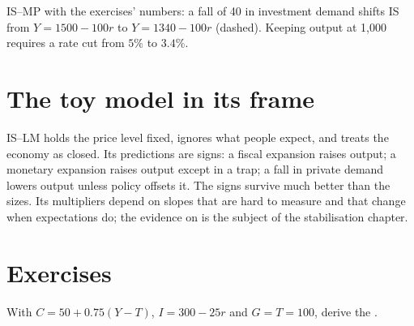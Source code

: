 \begin{omfigure}

{\small IS--MP with the exercises' numbers: a fall of 40 in investment demand
shifts IS from $Y = 1500 - 100r$ to $Y = 1340 - 100r$ (dashed). Keeping output at 1,000
requires a rate cut from $5\%$ to $3.4\%$.}
\end{omfigure}

\section{The toy model in its frame}\label{sec:b1:is-lm:frame}

IS--LM holds the price level fixed, ignores what people expect, and treats
the economy as closed. Its predictions are signs: a fiscal expansion raises
output; a monetary expansion raises output except in a trap; a fall in
private demand lowers output unless policy offsets it. The signs survive
much better than the sizes. Its multipliers depend on slopes that are hard
to measure and that change when expectations do; the evidence on  is the subject of the stabilisation chapter.

\section*{Exercises}\label{sec:b1:is-lm:exercises}

\begin{exercise}[$\star$]\label{exo:b1:is-lm:is-ex}
With $C = 50 + 0.75(Y - T)$, $I = 300 - 25r$ and $G = T = 100$, derive the .
\end{exercise}

